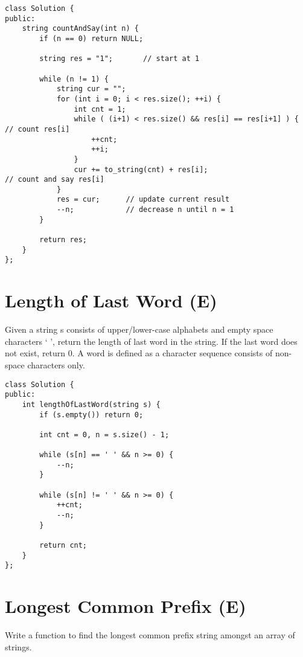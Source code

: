 \begin{lstlisting}
class Solution {
public:
    string countAndSay(int n) {
        if (n == 0) return NULL;
        
        string res = "1";       // start at 1
        
        while (n != 1) {
            string cur = "";
            for (int i = 0; i < res.size(); ++i) {
                int cnt = 1;
                while ( (i+1) < res.size() && res[i] == res[i+1] ) {        // count res[i]
                    ++cnt;
                    ++i;
                }
                cur += to_string(cnt) + res[i];                             // count and say res[i]
            }
            res = cur;      // update current result
            --n;            // decrease n until n = 1
        }
        
        return res;
    }
};
\end{lstlisting}


\section{Length of Last Word (E)}
Given a string s consists of upper/lower-case alphabets and empty space characters ` ', return the length of last word in the string. If the last word does not exist, return 0. A word is defined as a character sequence consists of non-space characters only. \\

\begin{lstlisting}
class Solution {
public:
    int lengthOfLastWord(string s) {
        if (s.empty()) return 0;
        
        int cnt = 0, n = s.size() - 1;
        
        while (s[n] == ' ' && n >= 0) {
            --n;
        }
        
        while (s[n] != ' ' && n >= 0) {
            ++cnt;
            --n;
        }
        
        return cnt;
    }
};
\end{lstlisting}


\section{Longest Common Prefix (E)}
Write a function to find the longest common prefix string amongst an array of strings. \\

